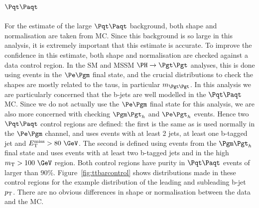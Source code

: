 \subsection{$\ttbar$}

For the estimate of the large $\ttbar$ background, both shape and normalisation
are taken from \ac{MC}. Since this background is so large in this analysis, it
is extremely important that this estimate is accurate. To improve the confidence
in this estimate, both shape and normalisation are checked against a data
control region. In the \ac{SM} and \ac{MSSM} $\HToTauTau$ analyses, this is done
using events in the $\emu$ final state, and the crucial distributions to check
the shapes are mostly related to the taus, in particular $m_{\Pgt\Pgt}$. In this
analysis we are particularly concerned that the b-jets are well modelled in the
$\ttbar$ \ac{MC}. Since we do not actually use the $\emu$ final state for this
analysis, we are also more concerned with checking $\mutau$ and $\etau$ events.
Hence two $\ttbar$ control regions are defined: the first is the same as is used
normally in the $\emu$ channel, and uses events with at least 2 jets, at least
one b-tagged jet and $\MET>80~\GeV$. The second is defined using events from the
$\mutau$ final state and uses events with at least two b-tagged jets and in the
high $m_{\text{T}}>100~\GeV$ region. Both control regions have purity in
$\ttbar$ events of larger than $90\%$. Figure~\ref{fig:ttbarcontrol} shows
distributions made in these control regions for the example distribution of the
leading and subleading b-jet $p_{\mathrm{T}}$. There are no obvious differences in shape or
normalisation between the data and the \ac{MC}.

